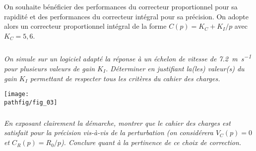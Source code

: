 \documentclass[10pt,fleqn]{article} %
\begin{document}
On souhaite bénéficier des performances du correcteur proportionnel pour sa rapidité et des performances du correcteur intégral pour sa précision.  On adopte alors un correcteur proportionnel intégral de la forme $C(p)=K_C + K_I/p$ avec $K_C = 5,6$.
 
\subparagraph{}\textit{On simule sur un logiciel adapté la réponse à un échelon de vitesse de \SI{7,2}{m.s^{-1}} pour plusieurs valeurs de gain $K_I$. Déterminer en justifiant la(les) valeur(s) du gain $K_I$ permettant de respecter tous les critères du cahier des charges. }


\begin{center}
\texttt{[image: \\pathfig/fig\_03]}
\end{center}

\subparagraph{}\textit{En exposant clairement la démarche, montrer que le cahier des charges est satisfait pour la précision vis-à-vis de la perturbation (on considérera $V_C (p) = 0$  et $C_R (p)=R_0/p$). Conclure quant à la pertinence de ce choix de correction. }
\end{document}
